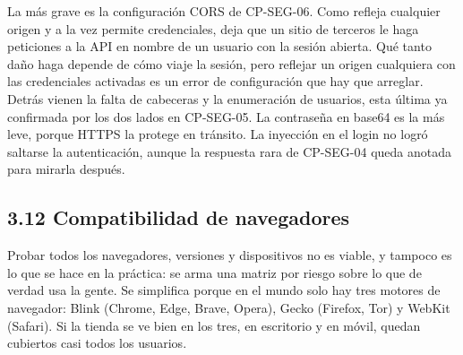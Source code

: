 \documentclass[11pt,a4paper]{article}
\begin{document}
La más grave es la configuración CORS de CP-SEG-06. Como refleja cualquier origen y a
la vez permite credenciales, deja que un sitio de terceros le haga peticiones a la
API en nombre de un usuario con la sesión abierta. Qué tanto daño haga depende de
cómo viaje la sesión, pero reflejar un origen cualquiera con las credenciales
activadas es un error de configuración que hay que arreglar. Detrás vienen la falta
de cabeceras y la enumeración de usuarios, esta última ya confirmada por los dos
lados en CP-SEG-05. La contraseña en base64 es la más leve, porque HTTPS la protege
en tránsito. La inyección en el login no logró saltarse la autenticación, aunque la
respuesta rara de CP-SEG-04 queda anotada para mirarla después.

\subsection*{3.12 Compatibilidad de navegadores}

Probar todos los navegadores, versiones y dispositivos no es viable, y tampoco es lo
que se hace en la práctica: se arma una matriz por riesgo sobre lo que de verdad usa
la gente. Se simplifica porque en el mundo solo hay tres motores de navegador: Blink
(Chrome, Edge, Brave, Opera), Gecko (Firefox, Tor) y WebKit (Safari). Si la tienda
se ve bien en los tres, en escritorio y en móvil, quedan cubiertos casi todos los
usuarios.
\end{document}
